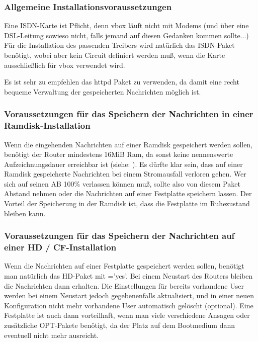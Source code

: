 \subsubsection{Allgemeine Installationsvoraussetzungen}

Eine ISDN-Karte ist Pflicht, denn vbox läuft nicht mit Modems 
(und über eine DSL-Leitung sowieso nicht, falls jemand auf diesen Gedanken kommen sollte...)
Für die Installation des passenden Treibers wird natürlich das ISDN-Paket benötigt, 
wobei aber kein Circuit definiert werden muß, wenn die Karte ausschließlich für vbox verwendet wird.

Es ist sehr zu empfehlen das httpd Paket zu verwenden, da damit eine recht bequeme
Verwaltung der gespeicherten Nachrichten möglich ist.


\subsubsection{Voraussetzungen für das Speichern der Nachrichten in einer Ramdisk-Installation}

Wenn die eingehenden Nachrichten auf einer Ramdisk gespeichert werden sollen, 
benötigt der Router mindestens 16MiB Ram, da sonst keine nennenswerte Aufzeichnungsdauer 
erreichbar ist (siehe: ).
Es dürfte klar sein, dass auf einer Ramdisk gespeicherte Nachrichten bei einem Stromausfall 
verloren gehen. Wer sich auf seinen AB 100\% verlassen können muß, sollte also von diesem Paket 
Abstand nehmen oder die Nachrichten auf einer Festplatte speichern lassen. Der Vorteil der
Speicherung in der Ramdisk ist, dass die Festplatte im Ruhezustand bleiben kann.

\subsubsection{Voraussetzungen für das Speichern der Nachrichten auf einer HD / CF-Installation}

Wenn die Nachrichten auf einer Festplatte gespeichert werden sollen, benötigt man natürlich 
das HD-Paket mit ='yes'. Bei einem Neustart des Routers bleiben die Nachrichten 
dann erhalten. Die Einstellungen für bereits vorhandene User werden bei einem Neustart jedoch 
gegebenenfalls aktualisiert, und in einer neuen Konfiguration nicht mehr vorhandene User 
automatisch gelöscht (optional). Eine Festplatte ist auch dann vorteilhaft, 
wenn man viele verschiedene Ansagen oder zusätzliche OPT-Pakete benötigt, da der Platz auf dem
Bootmedium dann eventuell nicht mehr ausreicht.

